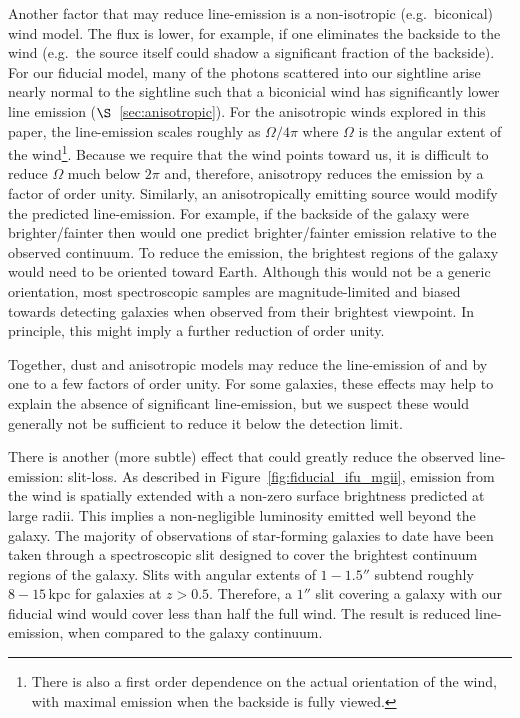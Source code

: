 \documentclass[12pt,preprint]{aastex}
\begin{document}
Another factor that may reduce line-emission is a
non-isotropic (e.g.\ biconical) wind model. The flux is lower, for example, if one
eliminates the backside to the wind (e.g.\ the source itself could
shadow a significant fraction of the backside).  
For our fiducial model, many of the photons scattered into our
sightline arise nearly normal to the sightline such that a biconicial
wind has significantly lower line emission
($\S$~\ref{sec:anisotropic}). 
For the anisotropic winds explored in this paper,
the line-emission scales 
roughly as $\Omega/4\pi$ where $\Omega$ is the angular extent of the
wind\footnote{There is also a first order dependence on the actual
  orientation of the wind, with maximal emission when the backside is
  fully viewed.}.  Because we require that the wind 
points toward us, it is difficult to reduce $\Omega$ much
below $2 \pi$ and, therefore, anisotropy reduces the
emission by a factor of order unity.  
Similarly, an anisotropically emitting source would modify the predicted
line-emission.  For example, if the backside of the galaxy were
brighter/fainter then would one predict brighter/fainter emission
relative to the observed continuum.
To reduce the emission, the brightest regions
of the galaxy would need to be oriented toward Earth.  Although this
would not be a
generic orientation, most spectroscopic samples are magnitude-limited
and biased towards detecting galaxies when observed from their
brightest viewpoint.  In principle, this might imply a further
reduction of order unity.

Together, dust and anisotropic models may reduce the line-emission
of  and 
by one to a few factors of order unity.  For some galaxies, these
effects may help to explain the absence of significant line-emission,
but we suspect these would generally
not be sufficient to reduce it below the detection limit. 

There is another (more subtle) effect that could
greatly reduce the observed line-emission: slit-loss.  As
described in Figure~\ref{fig:fiducial_ifu_mgii}, 
emission from the wind is spatially extended with
a non-zero surface brightness predicted at large radii. This implies 
a non-negligible luminosity emitted well beyond the galaxy.  
The majority of observations of star-forming galaxies to date have
been taken through a spectroscopic slit designed to cover
the brightest continuum regions of the galaxy. Slits with angular
extents of $1-1.5''$ subtend roughly $8-15$\,kpc for galaxies at $z>0.5$.
Therefore, a $1''$ slit covering a galaxy with our fiducial wind would cover
less than half the full wind.  The result is reduced line-emission,
when compared to the galaxy continuum.
\end{document}
